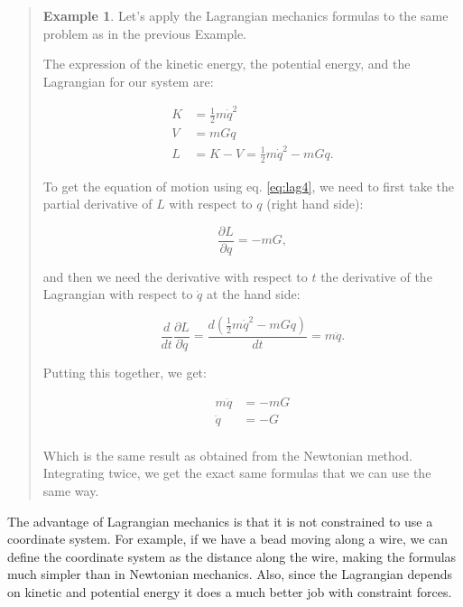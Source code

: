 \documentclass[
  9pt,
]{extbook}
\theoremstyle{definition}
\theoremstyle{definition}
\newtheorem{example}{Example}[chapter]
\theoremstyle{definition}
\theoremstyle{remark}
\begin{document}
\begin{quote}
\begin{example}
\protect\hypertarget{exm:lagrangianEx}{}{\label{exm:lagrangianEx} }
Let's apply the Lagrangian mechanics formulas to the same problem as in the previous Example.

The expression of the kinetic energy, the potential energy, and the Lagrangian for our system are:

\begin{equation}
\begin{aligned}
K &= \frac{1}{2}m\dot{q}^2 \\
V &= mGq \\
L &= K-V = \frac{1}{2}m\dot{q}^2 - mGq.
\end{aligned}
\end{equation}

To get the equation of motion using eq. \eqref{eq:lag4}, we need to first take the partial derivative of \(L\) with respect to \(q\) (right hand side):

\begin{equation}
\frac{\partial L}{\partial q}=-mG,
\end{equation}

and then we need the derivative with respect to \(t\) the derivative of the Lagrangian with respect to \(\dot{q}\) at the hand side:

\begin{equation}
\frac{d}{dt}\frac{\partial L}{\partial \dot{q}} = \frac{d\left(\frac{1}{2}m\dot{q}^2 - mGq\right)}{dt}= m\ddot{q}.
\end{equation}

Putting this together, we get:

\begin{equation}
\begin{aligned}
m\ddot{q}&=-mG \\
\ddot{q} &= -G \\
\end{aligned}
\end{equation}

Which is the same result as obtained from the Newtonian method. Integrating twice, we get the exact same formulas that we can use the same way.
\end{example}
\end{quote}

The advantage of Lagrangian mechanics is that it is not constrained to use a coordinate system. For example, if we have a bead moving along a wire, we can define the coordinate system as the distance along the wire, making the formulas much simpler than in Newtonian mechanics. Also, since the Lagrangian depends on kinetic and potential energy it does a much better job with constraint forces.
\end{document}
